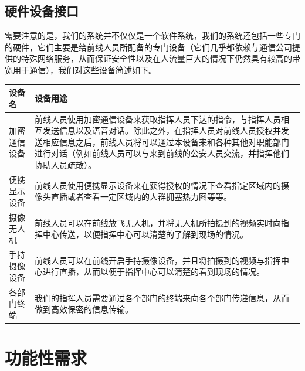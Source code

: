 \documentclass{ctexrep}
\begin{document}
\subsection{硬件设备接口}
需要注意的是，我们的系统并不仅仅是一个软件系统，我们的系统还包括一些专门的硬件，它们主要是给前线人员所配备的专门设备（它们几乎都依赖与通信公司提供的特殊网络服务，从而保证安全性以及在人流量巨大的情况下仍然具有较高的带宽用于通信），我们对这些设备简述如下。
\begin{longtable}{p{2cm}|p{10cm}}
\hline
设备名 & 设备用途 \\
\hline
\hline
加密通信设备 & 前线人员使用加密通信设备来获取指挥人员下达的指令，与指挥人员相互发送信息以及语音对话。除此之外，在指挥人员对前线人员授权并发送相应信息之后，前线人员将可以通过本设备来和各种其他对职能部门进行对话（例如前线人员可以与来到前线的公安人员交流，并指挥他们协助人员疏散）。 \\
\hline
便携显示设备 & 前线人员使用便携显示设备来在获得授权的情况下查看指定区域内的摄像头直播或者查看一定区域内的人群拥塞热力图等等。 \\
\hline
摄像无人机 & 前线人员可以在前线放飞无人机，并将无人机所拍摄到的视频实时向指挥中心传送，以便指挥中心可以清楚的了解到现场的情况。 \\
\hline
手持摄像设备 & 前线人员可以在前线开启手持摄像设备，并且将拍摄到的视频与指挥中心进行直播，从而以便于指挥中心可以清楚的看到现场的情况。 \\
\hline
各部门终端 & 我们的指挥人员需要通过各个部门的终端来向各个部门传递信息，从而做到高效保密的信息传输。\\
\hline
\end{longtable}
\section{功能性需求}
\end{document}
